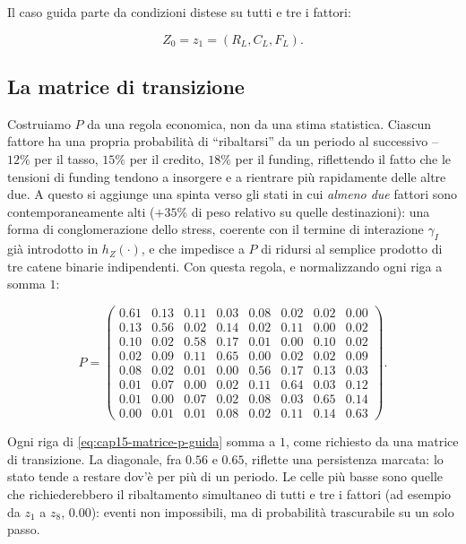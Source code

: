 Il caso guida parte da condizioni distese su tutti e tre i fattori:

\[
Z_0=z_1=(R_L,C_L,F_L).
\]

\subsection{La matrice di transizione}

Costruiamo $P$ da una regola economica, non da una stima statistica.
Ciascun fattore ha una propria probabilit\`a di ``ribaltarsi'' da un
periodo al successivo -- $12\%$ per il tasso, $15\%$ per il credito,
$18\%$ per il funding, riflettendo il fatto che le tensioni di funding
tendono a insorgere e a rientrare pi\`u rapidamente delle altre due. A
questo si aggiunge una spinta verso gli stati in cui \emph{almeno due}
fattori sono contemporaneamente alti ($+35\%$ di peso relativo su quelle
destinazioni): una forma di conglomerazione dello stress, coerente con il
termine di interazione $\gamma_I$ gi\`a introdotto in $h_Z(\cdot)$, e che
impedisce a $P$ di ridursi al semplice prodotto di tre catene binarie
indipendenti. Con questa regola, e normalizzando ogni riga a somma $1$:

\[
P=
\begin{pmatrix}
0.61 & 0.13 & 0.11 & 0.03 & 0.08 & 0.02 & 0.02 & 0.00 \\
0.13 & 0.56 & 0.02 & 0.14 & 0.02 & 0.11 & 0.00 & 0.02 \\
0.10 & 0.02 & 0.58 & 0.17 & 0.01 & 0.00 & 0.10 & 0.02 \\
0.02 & 0.09 & 0.11 & 0.65 & 0.00 & 0.02 & 0.02 & 0.09 \\
0.08 & 0.02 & 0.01 & 0.00 & 0.56 & 0.17 & 0.13 & 0.03 \\
0.01 & 0.07 & 0.00 & 0.02 & 0.11 & 0.64 & 0.03 & 0.12 \\
0.01 & 0.00 & 0.07 & 0.02 & 0.08 & 0.03 & 0.65 & 0.14 \\
0.00 & 0.01 & 0.01 & 0.08 & 0.02 & 0.11 & 0.14 & 0.63
\end{pmatrix}.
\label{eq:cap15-matrice-p-guida}
\]

\begin{remark}

Ogni riga di \eqref{eq:cap15-matrice-p-guida} somma a $1$, come richiesto
da una matrice di transizione. La diagonale, fra $0.56$ e $0.65$, riflette
una persistenza marcata: lo stato tende a restare dov'\`e per pi\`u di un
periodo. Le celle pi\`u basse sono quelle che richiederebbero il
ribaltamento simultaneo di tutti e tre i fattori (ad esempio da $z_1$ a
$z_8$, $0.00$): eventi non impossibili, ma di probabilit\`a trascurabile
su un solo passo.

\end{remark}

